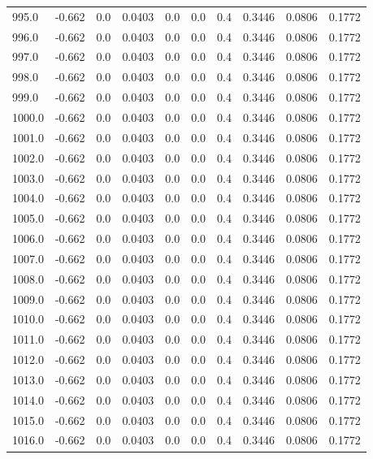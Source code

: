 \begin{longtable}{lrrrrrrrrr}
995.0 & -0.662 & 0.0 & 0.0403 & 0.0 & 0.0 & 0.4 & 0.3446 & 0.0806 & 0.1772 \\
996.0 & -0.662 & 0.0 & 0.0403 & 0.0 & 0.0 & 0.4 & 0.3446 & 0.0806 & 0.1772 \\
997.0 & -0.662 & 0.0 & 0.0403 & 0.0 & 0.0 & 0.4 & 0.3446 & 0.0806 & 0.1772 \\
998.0 & -0.662 & 0.0 & 0.0403 & 0.0 & 0.0 & 0.4 & 0.3446 & 0.0806 & 0.1772 \\
999.0 & -0.662 & 0.0 & 0.0403 & 0.0 & 0.0 & 0.4 & 0.3446 & 0.0806 & 0.1772 \\
1000.0 & -0.662 & 0.0 & 0.0403 & 0.0 & 0.0 & 0.4 & 0.3446 & 0.0806 & 0.1772 \\
1001.0 & -0.662 & 0.0 & 0.0403 & 0.0 & 0.0 & 0.4 & 0.3446 & 0.0806 & 0.1772 \\
1002.0 & -0.662 & 0.0 & 0.0403 & 0.0 & 0.0 & 0.4 & 0.3446 & 0.0806 & 0.1772 \\
1003.0 & -0.662 & 0.0 & 0.0403 & 0.0 & 0.0 & 0.4 & 0.3446 & 0.0806 & 0.1772 \\
1004.0 & -0.662 & 0.0 & 0.0403 & 0.0 & 0.0 & 0.4 & 0.3446 & 0.0806 & 0.1772 \\
1005.0 & -0.662 & 0.0 & 0.0403 & 0.0 & 0.0 & 0.4 & 0.3446 & 0.0806 & 0.1772 \\
1006.0 & -0.662 & 0.0 & 0.0403 & 0.0 & 0.0 & 0.4 & 0.3446 & 0.0806 & 0.1772 \\
1007.0 & -0.662 & 0.0 & 0.0403 & 0.0 & 0.0 & 0.4 & 0.3446 & 0.0806 & 0.1772 \\
1008.0 & -0.662 & 0.0 & 0.0403 & 0.0 & 0.0 & 0.4 & 0.3446 & 0.0806 & 0.1772 \\
1009.0 & -0.662 & 0.0 & 0.0403 & 0.0 & 0.0 & 0.4 & 0.3446 & 0.0806 & 0.1772 \\
1010.0 & -0.662 & 0.0 & 0.0403 & 0.0 & 0.0 & 0.4 & 0.3446 & 0.0806 & 0.1772 \\
1011.0 & -0.662 & 0.0 & 0.0403 & 0.0 & 0.0 & 0.4 & 0.3446 & 0.0806 & 0.1772 \\
1012.0 & -0.662 & 0.0 & 0.0403 & 0.0 & 0.0 & 0.4 & 0.3446 & 0.0806 & 0.1772 \\
1013.0 & -0.662 & 0.0 & 0.0403 & 0.0 & 0.0 & 0.4 & 0.3446 & 0.0806 & 0.1772 \\
1014.0 & -0.662 & 0.0 & 0.0403 & 0.0 & 0.0 & 0.4 & 0.3446 & 0.0806 & 0.1772 \\
1015.0 & -0.662 & 0.0 & 0.0403 & 0.0 & 0.0 & 0.4 & 0.3446 & 0.0806 & 0.1772 \\
1016.0 & -0.662 & 0.0 & 0.0403 & 0.0 & 0.0 & 0.4 & 0.3446 & 0.0806 & 0.1772 \\

\end{longtable}
